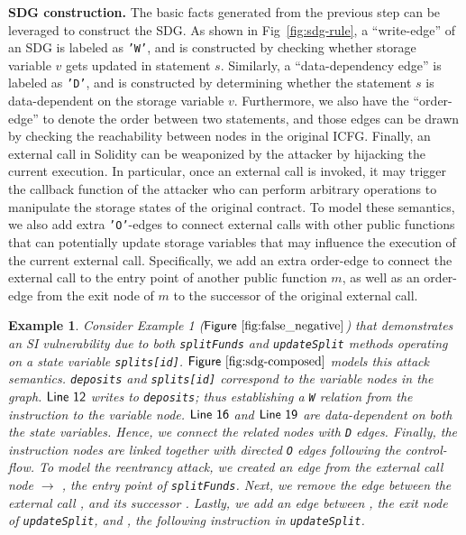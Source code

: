 \documentclass[conference, romanappendices]{tex/IEEEtran}
\theoremstyle{bfnote}
\newcommand{\solidity}{{\sc Solidity}\xspace}
\newcommand{\reentrancy}{{reentrancy}\xspace}
\newcommand{\Line}[1]{\ensuremath{\sf Line~ #1}}
\newcommand{\Fig}[1]{\ensuremath{\sf Figure~\ref{#1}}}
\newcommand*\circledtext[1]{\tikz[baseline=(char.base)]{\node[shape=circle,fill,inner sep=1pt] (char) {\textcolor{white}{\small{#1}}};}}
\newtheorem{example}{Example}
\begin{document}
\noindent
\textbf{SDG construction.}
The basic facts generated from the previous step can be leveraged to construct the SDG.
As shown in Fig~\ref{fig:sdg-rule}, a ``write-edge'' of an SDG is labeled as \texttt{'W'}, and is constructed by checking whether storage variable $v$ gets updated in statement $s$.
Similarly, a ``data-dependency edge'' is labeled as \texttt{'D'}, and is constructed by determining whether the statement $s$ is data-dependent on the storage variable $v$.
Furthermore, we also have the ``order-edge'' to denote the order between two statements, and those edges can be drawn by checking the reachability between nodes in the original ICFG.
Finally, an external call in \solidity can be weaponized by the attacker by hijacking the current execution.
In particular, once an external call is invoked, it may trigger the callback function of the attacker who can perform arbitrary operations to manipulate the storage states of the original contract.
To model these semantics, we also add extra \texttt{'O'}-edges to connect external calls with other public functions that can potentially update storage variables that may influence the execution of the current external call.
Specifically, we add an extra order-edge to connect the external call to the entry point of another public function $m$, as well as an order-edge from the exit node of $m$ to the successor of the original external call.
\vspace{-1.5mm}
\noindent
\begin{example}
Consider Example 1 (\Fig{fig:false_negative}) that demonstrates an SI vulnerability due to both \texttt{splitFunds} and \texttt{updateSplit} methods operating on a state variable \texttt{splits[id]}.
\Fig{fig:sdg-composed} models this attack semantics.
\texttt{deposits} and \texttt{splits[id]} correspond to the variable nodes in the graph.
\Line{12} writes to \texttt{deposits}; thus establishing a \texttt{W} relation from the instruction to the variable node.
\Line{16} and \Line{19} are data-dependent on both the state variables.
Hence, we connect the related nodes with \texttt{D} edges.
Finally, the instruction nodes are linked together with directed \texttt{O} edges following the control-flow.
To model the \reentrancy attack, we created an edge from the external call node \circledtext{2} $\rightarrow$ \circledtext{4}, the entry point of \texttt{splitFunds}.
Next, we remove the edge between the external call \circledtext{2}, and its successor \circledtext{3}.
Lastly, we add an edge between \circledtext{5}, the exit node of \texttt{updateSplit}, and \circledtext{3}, the following instruction in \texttt{updateSplit}.
\end{example}
\end{document}
